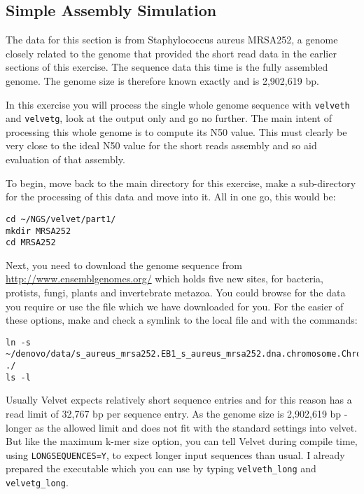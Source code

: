 \subsection{Simple Assembly Simulation}

\begin{note}
The data for this section is from Staphylococcus aureus MRSA252, a genome
closely related to the genome that provided the short read data in the earlier
sections of this exercise. The sequence data this time is the fully assembled
genome. The genome size is therefore known exactly and is 2,902,619 bp.
\end{note}

\begin{information}
In this exercise you will process the single whole genome sequence with \texttt{velveth}
and \texttt{velvetg}, look at the output only and go no further. The main intent of
processing this whole genome is to compute its N50 value. This must clearly be
very close to the ideal N50 value for the short reads assembly and so aid
evaluation of that assembly.
\end{information}

\begin{steps}
To begin, move back to the main directory for this exercise, make a
sub-directory for the processing of this data and move into it. All in one go,
this would be:
\begin{lstlisting}
cd ~/NGS/velvet/part1/ 
mkdir MRSA252 
cd MRSA252
\end{lstlisting}

Next, you need to download the genome sequence from
\url{http://www.ensemblgenomes.org/} which holds five new sites, for bacteria,
protists, fungi, plants and invertebrate metazoa. You could browse for the data
you require or use the file which we have downloaded for you. For the easier of
these options, make and check a symlink to the local file and with the
commands:
\begin{lstlisting}
ln -s ~/denovo/data/s_aureus_mrsa252.EB1_s_aureus_mrsa252.dna.chromosome.Chromosome.fa.gz ./
ls -l
\end{lstlisting}

\end{steps}

\begin{note}
Usually Velvet expects relatively short sequence entries and for this reason has
a read limit of 32,767 bp per sequence entry. As the genome size is 2,902,619 bp
- longer as the allowed limit and does not fit with the standard settings into
velvet. But like the maximum k-mer size option, you can tell Velvet during
compile time, using \texttt{LONGSEQUENCES=Y}, to expect longer input sequences
than usual. I already prepared the executable which you can use by typing
\texttt{velveth\_long} and \texttt{velvetg\_long}.
\end{note}

